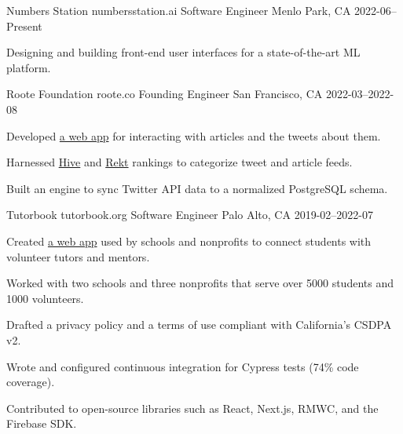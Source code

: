 

\begin{cventries}

  \cventry
    {Numbers Station} %
    {numbersstation.ai} %
    {Software Engineer} %
    {Menlo Park, CA} %
    {2022-06–Present} %
    {
      \begin{cvitems} %
        \item {Designing and building front-end user interfaces for a state-of-the-art ML platform.}
      \end{cvitems}
    }

  \cventry
    {Roote Foundation} %
    {roote.co} %
    {Founding Engineer} %
    {San Francisco, CA} %
    {2022-03–2022-08} %
    {
      \begin{cvitems} %
        \item {Developed \href{https://github.com/rooteco/tweetscape}{a web app} for interacting with articles and the tweets about them.}
        \item {Harnessed \href{https://hive.one}{Hive} and \href{https://feed.rekt.news/parlor}{Rekt} rankings to categorize tweet and article feeds.}
        \item {Built an engine to sync Twitter API data to a normalized PostgreSQL schema.}
      \end{cvitems}
    }

  \cventry
    {Tutorbook} %
    {tutorbook.org} %
    {Software Engineer} %
    {Palo Alto, CA} %
    {2019-02–2022-07} %
    {
      \begin{cvitems} %
        \item {Created \href{https://github.com/tutorbookapp/tutorbook}{a web app} used by schools and nonprofits to connect students with volunteer tutors and mentors.}
        \item {Worked with two schools and three nonprofits that serve over 5000 students and 1000 volunteers.}
        \item {Drafted a privacy policy and a terms of use compliant with California's CSDPA v2.}
        \item {Wrote and configured continuous integration for Cypress tests (74\% code coverage).}
        \item {Contributed to open-source libraries such as React, Next.js, RMWC, and the Firebase SDK.}
      \end{cvitems}
    }


\end{cventries}
